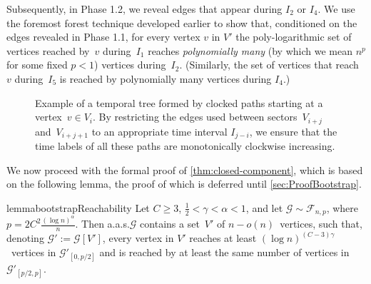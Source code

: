 \documentclass[a4paper,11pt]{article}
\makeatletter
\theoremstyle{definition}
\theoremstyle{plain}
\newcommand{\G}{\mathcal G}
\newcommand{\F}{\mathcal F}
\newcommand{\aas}{a.a.s.\@\xspace}
\makeatother
\begin{document}
  Subsequently, in Phase 1.2, we reveal edges that appear during $I_2$ or $I_4$. 
  We use the foremost forest technique developed earlier to show that,
  conditioned on the edges revealed in Phase 1.1, for every vertex $v$ in $V'$ the poly-logarithmic set of
  vertices reached by~$v$ during~$I_1$ reaches \emph{polynomially many} (by which we mean $n^p$ for some fixed $p<1$) vertices during~$I_2$. (Similarly,
  the set of vertices that reach~$v$ during~$I_5$ is reached by polynomially many 
  vertices during $I_4$.)


\begin{figure}[hbt]
  \centering
{}
  \caption{
    Example of a temporal tree formed by clocked paths starting at a vertex~$v \in V_i$.
    By restricting the edges used between sectors~$V_{i+j}$ and~$V_{i+j+1}$ to an appropriate time interval $I_{j-i}$,
    we ensure that the time labels of all these paths are monotonically clockwise increasing.
  }
  \label{fig:sectors}
\end{figure}


We now proceed with the formal proof of \cref{thm:closed-component}, which is based on the following lemma, the proof of which is deferred until \cref{sec:ProofBootstrap}.

\begin{restatable}{lemma}{bootstrapReachability}
	\label{lm:bootstrap-reachability}
	Let $C \geq 3$, $\frac{1}{2}<\gamma<\alpha<1$, and let
	$\G \sim \F_{n,p}$, where~$p = 2C^2 \frac{(\log n)^\alpha}{n}$.
	Then \aas $\G$ contains a set~$V'$ of $n-o(n)$~vertices,
	such that, denoting $\G' := \G[V']$, every vertex in $V'$ 
	reaches at least $(\log n)^{(C-3)\gamma}$~vertices in $\G'_{[0,p/2]}$ and
	is reached by at least the same number of vertices in $\G'_{[p/2,p]}$.
\end{restatable}
\end{document}
